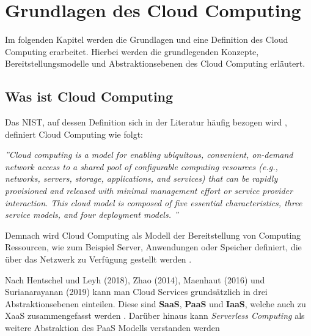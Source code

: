 \section{Grundlagen des Cloud Computing}
\label{sec:cloud-computing}

Im folgenden Kapitel werden die Grundlagen und eine Definition des Cloud Computing erarbeitet. Hierbei werden die grundlegenden Konzepte, Bereitstellungsmodelle und Abstraktionsebenen des Cloud Computing erläutert.

\subsection{Was ist Cloud Computing}
Das \ac{NIST}, auf dessen Definition sich in der Literatur häufig bezogen wird \cite[Vgl.][S. 4f]{Reinheimer2018}, definiert Cloud Computing wie folgt:

\textit{''Cloud computing is a model for enabling ubiquitous, convenient, on-demand network access to a shared pool of configurable computing resources (e.g., networks, servers, storage, applications, and services) that can be rapidly provisioned and released with minimal management effort or service provider interaction. This cloud model is composed of five essential characteristics, three service models, and four deployment models. ''} \cite[][S. 2]{Mell2011}

Demnach wird Cloud Computing als Modell der Bereitstellung von Computing Ressourcen, wie zum Beispiel Server, Anwendungen oder Speicher definiert, die über das Netzwerk zu Verfügung gestellt werden \cite[Vgl.][S. 5]{Reinheimer2018}.

Nach Hentschel und Leyh (2018), Zhao (2014), Maenhaut (2016) und Surianarayanan (2019) kann man Cloud Services grundsätzlich in drei Abstraktionsebenen einteilen. Diese sind \textbf{\ac{SaaS}}, \textbf{\ac{PaaS}} und \textbf{\ac{IaaS}}, welche auch zu \ac{XaaS} zusammengefasst werden \cite[Vgl.][S. 9]{Reinheimer2018}\cite[Vgl.][S. 143f]{Zhao2014}\cite[Vgl.][S. 32ff]{Maenhaut2016}\cite[Vgl.][S. 226ff]{Surianarayanan2019}.
Darüber hinaus kann \textit{Serverless Computing} als weitere Abstraktion des \ac{PaaS} Modells verstanden werden \cite[Vgl.][S. 11ff]{CNCF2018} \pagebreak


